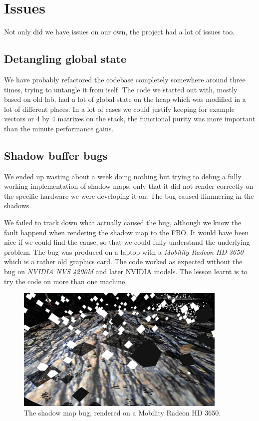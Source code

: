 \documentclass[a4paper,12pt]{article}
\begin{document}
\section{Issues}

Not only did we have issues on our own, the project had a lot of issues too.

\subsection{Detangling global state}

We have probably refactored the codebase completely somewhere around three times, trying to untangle it from iself. The code we started out with, mostly based on old lab, had a lot of global state on the heap which was modified in a lot of different places. In a lot of cases we could justify keeping for example vectors or 4 by 4 matrixes on the stack, the functional purity was more important than the minute performance gains.

\subsection{Shadow buffer bugs}

We ended up wasting about a week doing nothing but trying to debug a fully working implementation of shadow maps, only that it did not render correctly on the specific hardware we were developing it on. The bug caused flimmering in the shadows.

We failed to track down what actually caused the bug, although we know the fault happend when rendering the shadow map to the FBO. It would have been nice if we could find the cause, so that we could fully understand the underlying problem. The bug was produced on a laptop with a \emph{Mobility Radeon HD 3650} which is a rather old graphics card. The code worked as expected without the bug on \emph{NVIDIA NVS 4200M} and later NVIDIA models. The lesson learnt is to try the code on more than one machine.
\begin{figure}[H]
  \centering
  \includegraphics[width=0.9\textwidth]{shadow_map_bug}
  \caption{\label{fig:shadow-map-bug-image} The shadow map bug, rendered on a Mobility Radeon HD 3650.}
\end{figure}
\end{document}
